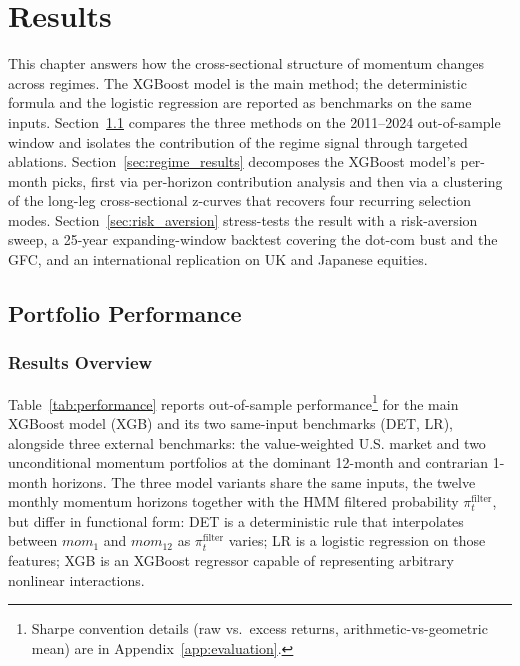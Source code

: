 \clearpage
\section{Results}\label{sec:results}

This chapter answers how the cross-sectional structure of momentum changes across regimes. The XGBoost model is the main method; the deterministic formula and the logistic regression are reported as benchmarks on the same inputs. Section~\ref{sec:performance_results} compares the three methods on the 2011--2024 out-of-sample window and isolates the contribution of the regime signal through targeted ablations. Section~\ref{sec:regime_results} decomposes the XGBoost model's per-month picks, first via per-horizon contribution analysis and then via a clustering of the long-leg cross-sectional z-curves that recovers four recurring selection modes. Section~\ref{sec:risk_aversion} stress-tests the result with a risk-aversion sweep, a 25-year expanding-window backtest covering the dot-com bust and the GFC, and an international replication on UK and Japanese equities.


\subsection{Portfolio Performance}\label{sec:performance_results}

\subsubsection{Results Overview}



Table~\ref{tab:performance} reports out-of-sample performance\footnote{Sharpe convention details (raw vs.\ excess returns, arithmetic-vs-geometric mean) are in Appendix~\ref{app:evaluation}.} for the main XGBoost model (XGB) and its two same-input benchmarks (DET, LR), alongside three external benchmarks: the value-weighted U.S. market and two unconditional momentum portfolios at the dominant 12-month and contrarian 1-month horizons. The three model variants share the same inputs, the twelve monthly momentum horizons together with the HMM filtered probability $\pi_t^{\text{filter}}$, but differ in functional form: DET is a deterministic rule that interpolates between $mom_1$ and $mom_{12}$ as $\pi_t^{\text{filter}}$ varies; LR is a logistic regression on those features; XGB is an XGBoost regressor capable of representing arbitrary nonlinear interactions.

